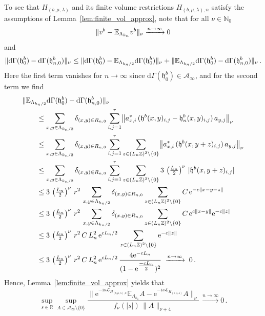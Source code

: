 \documentclass[a4paper]{article}
\newcommand{\E}{\mathbb{E}}
\newcommand{\e}{\mathrm{e}}
\renewcommand{\i}{\mathrm{i}}
\newcommand{\fd}{r}
\newcommand{\La}{\Lambda}
\newcommand{\N}{\mathbb{N}}
\newcommand{\Z}{\mathbb{Z}}
\newcommand{\mA}{\mathcal{A}}
\newcommand{\R}{\mathbb{R}}
\newcommand{\mL}{\mathcal{L}}
\newcommand{\dd}{\mathrm{d}}
\DeclarePairedDelimiter\norm{\lVert}{\rVert}
\DeclarePairedDelimiter\abs{\lvert}{\rvert}
\theoremstyle{plain}
\theoremstyle{definition}
\theoremstyle{remark}
\renewcommand{\(}{\left(}
\renewcommand{\)}{\right)}
\begin{document}
To see that $H_{(b,\mu,\lambda)}$ and its finite volume restrictions 
$H_{(b,\mu,\lambda),n}$ satisfy the assumptions of
Lemma~\ref{lem:finite_vol_approx}, note that for all $\nu \in \N_0$
\[
\norm{ v^b - \E_{\La_{k_n}}v^b}_{\nu} \xrightarrow{n\to \infty} 0
\]
and 
\[ 
\norm{  \dd\Gamma(\mathfrak{h}^b_0) -  \dd\Gamma(\mathfrak{h}^b_{n,0}) }_{\nu}
 \leq \norm{\dd\Gamma(\mathfrak{h}^b_0)  - \E_{\La_{k_n/2}} \dd\Gamma(\mathfrak{h}^b_0)  }_{\nu}+ 
\norm{\E_{\La_{k_n/2}} \dd\Gamma(\mathfrak{h}^b_0) -  \dd\Gamma(\mathfrak{h}^b_{n,0}) }_{\nu}\,.
 \]
 Here the first term vanishes for $n\to\infty$ since $\dd\Gamma(\mathfrak{h}^b_0)\in\mA_\infty$, and for the second term we find
\begin{align*}
 \hspace{2em}&\hspace{-2em}   
    \norm{\E_{\La_{k_n/2}} \dd\Gamma(\mathfrak{h}^b_0) -  \dd\Gamma(\mathfrak{h}^b_{n,0})  }_{\nu}
 \\
 &\leq
 \sum_{x,y\in\La_{k_n/2}} \delta_{(x,y)\in R_{n,0}}  \sum_{i,j =1}^\fd \norm*{ a^*_{x,i} \, (\mathfrak{h}^b(x,y)_{i,j}-\mathfrak{h}^b_n(x,y)_{i,j})\,  a_{y,j}}_{\nu} 
 \\
 &\leq \sum_{x,y\in\La_{k_n/2}} \delta_{(x,y)\in R_{n,0}} 
 \sum_{i,j =1}^\fd \sum_{z\in(L_n\Z)^2\setminus\{0\}}\norm*{ a^*_{x,i} \, (\mathfrak{h}^b(x,y+z)_{i,j})\,  a_{y,j}}_{\nu}
 \\
 &\leq
 \sum_{x,y\in\La_{k_n/2}} \delta_{(x,y)\in R_{n,0}} 
 \sum_{i,j =1}^\fd \sum_{z\in(L_n\Z)^2\setminus\{0\}}
  3\, \left(\tfrac{L_n}{2}\right)^\nu\, \abs{\mathfrak{h}^b(x,y+z)_{i,j}}
  \\
 &\leq 
 3\, \left(\tfrac{L_n}{2}\right)^\nu \,\fd^2\,\sum_{x,y\in\La_{k_n/2}} \delta_{(x,y)\in R_{n,0}} 
\sum_{z\in(L_n\Z)^2\setminus\{0\}}
    C\,   \e^{-c\|x-y-z \|}  
\\
&\leq
3\, \left(\tfrac{L_n}{2}\right)^\nu \,\fd^2\,\sum_{x,y\in\La_{k_n/2}} \delta_{(x,y)\in R_{n,0}} 
\sum_{z\in(L_n\Z)^2\setminus\{0\}}
    C\,   \e^{c\|x-y\|} \e^{-c\|z \|}  
\\
&\leq
3\, \left(\tfrac{L_n}{2}\right)^\nu \,\fd^2\,C\, L_n^2\,\e^{cL_n/2}\,
\sum_{z\in(L_n\Z)^2\setminus\{0\}}
     \e^{-c\| z\|}  
\\
&\leq
3\, \left(\tfrac{L_n}{2}\right)^\nu \,\fd^2\,C\, L_n^2\,\e^{cL_n/2}\,
  \frac{4\e^{-cL_n}}{(1- \e^{\tfrac{-cL_n}{2}})^2} \; \xrightarrow{n\to\infty}\;0  \,.     
\end{align*}
Hence, Lemma~\ref{lem:finite_vol_approx} yields that
\begin{equation} \label{eq:dynamics_converges}
        \sup_{s \in \R} \sup_{A\in \mA_\infty\setminus \{0\}} \frac{\lVert \e^{-\i s \mL_{H_{(b,\mu,\lambda),n}}}\E_{\La_{k_n}} A - \e^{-\i s \mL_{H_{(b,\mu,\lambda)}}} A \rVert_\nu}{f_\nu(|s|)\,\lVert A \rVert_{\nu+4}}\,  \xrightarrow{n\to \infty} 0\,.
\end{equation}
\end{document}
